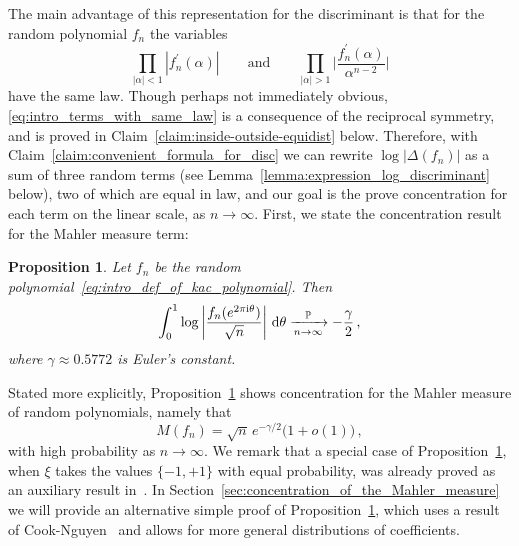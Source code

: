 \documentclass[11pt]{amsart}
\newtheorem{proposition}[theorem]{Proposition}
\theoremstyle{remark}
\theoremstyle{definition}
\newcommand{\bP}{\mathbb P}
\newcommand{\I}{{\rm i}}
\newcommand{\disc}{\Delta}
\begin{document}
    The main advantage of this representation for the discriminant is that for the random polynomial $f_n$ the variables
    \begin{equation}
        \label{eq:intro_terms_with_same_law}
        \prod_{|\alpha|<1} |f_n^{\prime}(\alpha)|   \qquad \text{and} \qquad \prod_{|\alpha|>1} \Big|\frac{f_n^\prime(\alpha)}{\alpha^{n-2}}\Big| 
    \end{equation}
        have the same law. Though perhaps not immediately obvious, \eqref{eq:intro_terms_with_same_law} is a consequence of the reciprocal symmetry, and is proved in Claim~\ref{claim:inside-outside-equidist} below. 
    Therefore, with Claim~\ref{claim:convenient_formula_for_disc} we can rewrite $\log|\disc(f_n)|$ as a sum of three random terms (see Lemma~\ref{lemma:expression_log_discriminant} below), two of which are equal in law, and our goal is the prove concentration for each term on the linear scale, as $n\to \infty$. First, we state the concentration result for the Mahler measure term:
    \begin{proposition}
		\label{prop:LLN_for_log_mahler_measure}
		Let $f_n$ be the random polynomial~\eqref{eq:intro_def_of_kac_polynomial}. Then 		
		\[
		\int_0^1\log \left|\frac{f_n(e^{2\pi \I \theta})}{\sqrt{n}} \right|\,{\rm d}\theta \xrightarrow[n\to \infty]{\bP} -\frac{\gamma}{2} \, ,
		\]
        where $\gamma\approx 0.5772$ is Euler's constant. 
	\end{proposition} 
    Stated more explicitly, Proposition~\ref{prop:LLN_for_log_mahler_measure} shows concentration for the Mahler measure of random polynomials, namely that
    \begin{equation*}
        \label{eq:intro-concentration_for_mahler_measure}
        M(f_n) = \sqrt{n}  \, e^{-\gamma/2}\big(1+o(1)\big) \, ,
    \end{equation*}
    with high probability as $n\to \infty$. 
    We remark that a special case of Proposition~\ref{prop:LLN_for_log_mahler_measure}, when $\xi$ takes the values $\{-1,+1\}$ with equal probability, was already proved as an auxiliary result in~\cite[Lemma~1.3]{Yakir-Studia}. In Section~\ref{sec:concentration_of_the_Mahler_measure} we will provide an alternative simple proof of Proposition~\ref{prop:LLN_for_log_mahler_measure}, which uses a result of Cook-Nguyen~\cite{Cook-Nguyen} and allows for more general distributions of coefficients.
\end{document}
